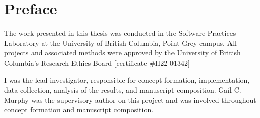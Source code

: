 
\chapter{Preface}

The work presented in this thesis was conducted in the Software Practices Laboratory at the University of British Columbia, Point Grey campus.
All projects and associated methods were approved by the University of British Columbia's Research Ethics Board [certificate \#H22-01342]

I was the lead investigator, responsible for concept formation, implementation, data collection, analysis of the results, and manuscript composition.
Gail C. Murphy was the supervisory author on this project and was involved throughout concept formation and manuscript composition.

\endinput

The Preface must include a statement indicating the student's contribution to the following:

\begin{itemize}
    \item Identification and design of the research program,
    \item Performance of the various parts of the research, and
    \item Analysis of the research data.
    \item Certain additional elements may also be required, as specified below.
\end{itemize}

